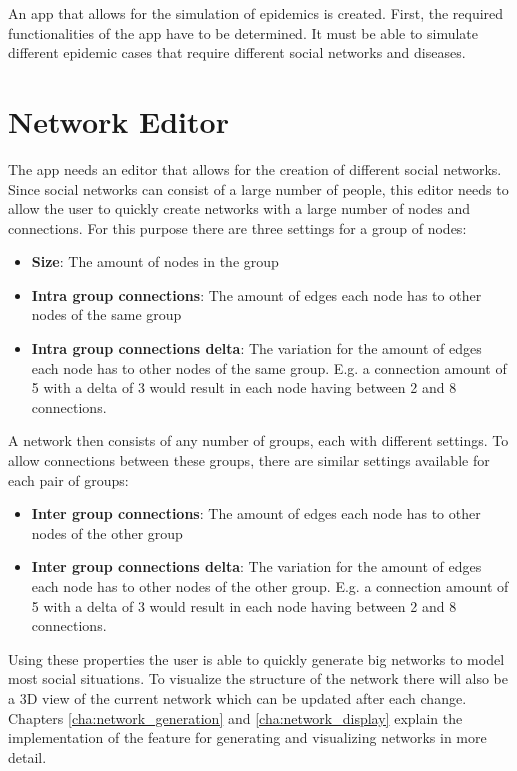 An app that allows for the simulation of epidemics is created. First, the required functionalities
of the app have to be determined. It must be able to simulate different epidemic cases that require
different social networks and diseases.

\section{Network Editor}
The app needs an editor that allows for the creation of different social networks. Since
social networks can consist of a large number of people, this editor needs to allow the user
to quickly create networks with a large number of nodes and connections. For this purpose there
are three settings for a group of nodes:

\begin{itemize}
    \item \textbf{Size}: The amount of nodes in the group
    \item \textbf{Intra group connections}: The amount of edges each node has to other nodes
    of the same group
    \item \textbf{Intra group connections delta}: The variation for the amount of edges each
    node has to other nodes of the same group. E.g. a connection amount of 5 with a delta of 3
    would result in each node having between 2 and 8 connections.
\end{itemize}

A network then consists of any number of groups, each with different settings. To allow
connections between these groups, there are similar settings available for each pair of
groups:

\begin{itemize}
    \item \textbf{Inter group connections}: The amount of edges each node has to other nodes
    of the other group
    \item \textbf{Inter group connections delta}: The variation for the amount of edges each
    node has to other nodes of the other group. E.g. a connection amount of 5 with a delta of 3
    would result in each node having between 2 and 8 connections.
\end{itemize}

Using these properties the user is able to quickly generate big networks to model most
social situations. To visualize the structure of the network there will also be a 3D view
of the current network which can be updated after each change. Chapters \ref{cha:network_generation}
and \ref{cha:network_display} explain the implementation of the feature for generating and visualizing networks in more detail.

